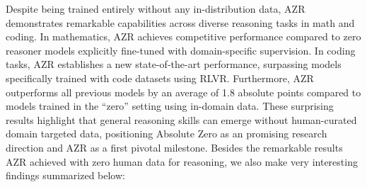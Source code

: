 \documentclass{article}
\begin{document}
Despite being trained entirely without any in-distribution data, AZR demonstrates remarkable capabilities across diverse reasoning tasks in math and coding. In mathematics, AZR achieves competitive performance compared to zero reasoner models explicitly fine-tuned with domain-specific supervision. In coding tasks, AZR establishes a new state-of-the-art performance, surpassing models specifically trained with code datasets using RLVR. Furthermore, AZR outperforms all previous models by an average of 1.8 absolute points compared to models trained in the ``zero'' setting using in-domain data. These surprising results highlight that general reasoning skills can emerge without human-curated domain targeted data, positioning Absolute Zero as an promising research direction and AZR as a first pivotal milestone. Besides the remarkable results AZR achieved with zero human data for reasoning, we also make very interesting findings summarized below:
\end{document}
